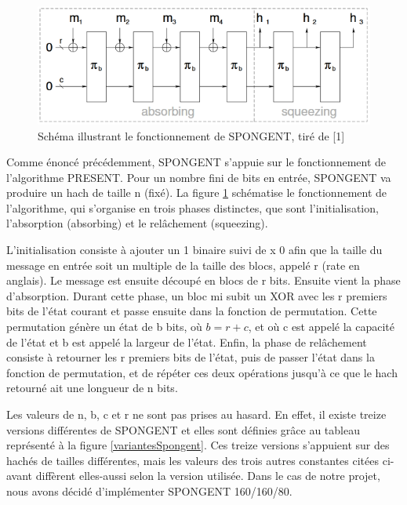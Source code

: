 		\begin{figure}[h]
			 	\centering
			 	\includegraphics[scale=0.8]{imgs/Spongent/fctGlobalSpongent.png}
			 	\caption{Schéma illustrant le fonctionnement de SPONGENT, tiré de [1]}
			 	\label{fctGlobalSpongent}
		\end{figure}

		Comme énoncé précédemment, SPONGENT s’appuie sur le fonctionnement de l’algorithme PRESENT.
		Pour un nombre fini de bits en entrée, SPONGENT va produire un hach de taille n (fixé).
		La figure \ref{fctGlobalSpongent} schématise le fonctionnement de l’algorithme, qui s’organise en trois phases distinctes, que sont l’initialisation, l’absorption (absorbing) et le relâchement (squeezing).

		L’initialisation consiste à ajouter un 1 binaire suivi de x 0 afin que la taille du message en entrée soit un multiple de la taille des blocs, appelé r (rate en anglais).
		Le message est ensuite découpé en blocs de r bits.
		Ensuite vient la phase d’absorption.
		Durant cette phase, un bloc mi subit un XOR avec les r premiers bits de l’état courant et passe ensuite dans la fonction de permutation.
		Cette permutation génère un état de b bits, où $b = r + c$, et où c est appelé la capacité de l’état et b est appelé la largeur de l’état.
		Enfin, la phase de relâchement consiste à retourner les r premiers bits de l’état, puis de passer l’état dans la fonction de permutation,
		et de répéter ces deux opérations jusqu’à ce que le hach retourné ait une longueur de n bits.

		Les valeurs de n, b, c et r ne sont pas prises au hasard. En effet, il existe treize versions différentes de SPONGENT et elles sont définies grâce au tableau représenté à la figure \ref{variantesSpongent}.
		Ces treize versions s’appuient sur des hachés de tailles différentes, mais les valeurs des trois autres constantes citées ci-avant diffèrent elles-aussi selon la version utilisée.
		Dans le cas de notre projet, nous avons décidé d’implémenter SPONGENT 160/160/80.
		
